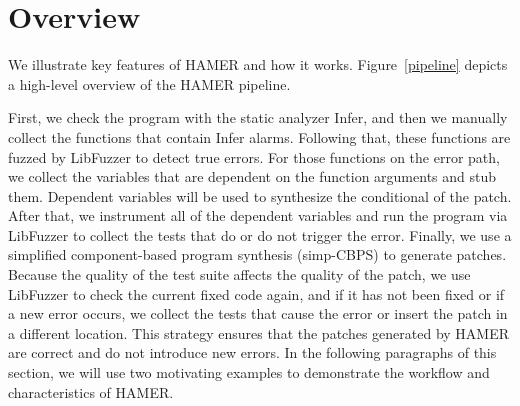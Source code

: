 \documentclass[a4paper,11pt,oneside,openany]{book}
\begin{document}
\chapter{Overview}
\label{overview}
We illustrate key features of HAMER and how it works. Figure~\ref{pipeline} depicts a high-level overview of the HAMER pipeline.

First, we check the program with the static analyzer \mbox{Infer}, and then we manually collect the functions that contain Infer alarms. Following that, these functions are fuzzed by LibFuzzer to detect true errors.  For those functions on the error path, we collect the variables that are dependent on the function arguments and stub them. Dependent variables will be used to synthesize the conditional of the patch. After that, we instrument all of the dependent variables and run the program via LibFuzzer to collect the tests that do or do not trigger the error. Finally, we use a simplified component-based program synthesis (simp-CBPS) to generate patches. Because the quality of the test suite affects the quality of the patch, we use LibFuzzer to check the current fixed code again, and if it has not been fixed or if a new error occurs, we collect the tests that cause the error or insert the patch in a different location. This strategy ensures that the patches generated by HAMER are correct and do not introduce new errors. In the following paragraphs of this section, we will use two motivating examples to demonstrate the workflow and characteristics of HAMER.
\end{document}
